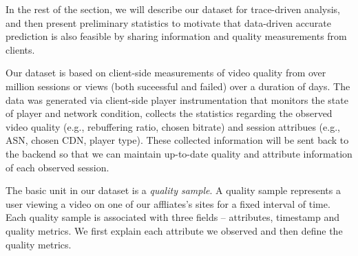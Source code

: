  In the rest of the section, we will describe our dataset for trace-driven analysis, and then present preliminary statistics to motivate that data-driven accurate prediction is also feasible by sharing information and quality measurements from clients. 


 Our dataset is based on client-side measurements of video quality from over \fillme million sessions or views (both suceessful and failed) over a duration of \fillme days. The data was generated via client-side player instrumentation that monitors the state of player and network condition, collects the statistics regarding the observed video quality (e.g., rebuffering ratio, chosen bitrate) and session attribues (e.g., ASN, chosen CDN, player type). These collected information will be sent back to the backend so that we can maintain up-to-date quality and attribute information of each observed session.

 The basic unit in our dataset is a {\it quality sample}. A quality sample represents a user viewing a video on one of our affliates's sites for a fixed interval of time. Each quality sample is associated with three fields -- attributes, timestamp and quality metrics. 
We first explain each attribute we observed and then define the quality metrics.

